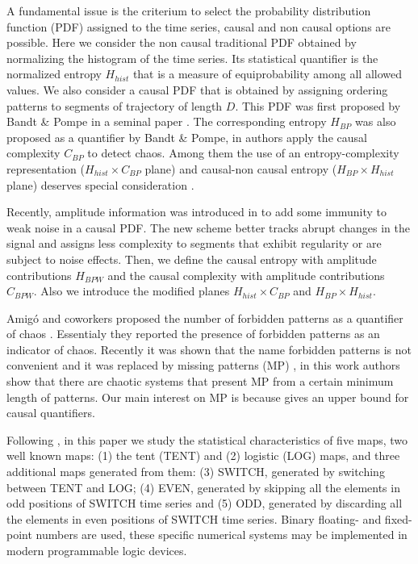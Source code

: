 A fundamental issue is the criterium to select the probability distribution function (PDF) assigned to the time series, causal and non causal options are possible.
Here we consider the non causal traditional PDF obtained by normalizing the histogram of the time series.
Its statistical quantifier is the normalized entropy $H_{hist}$ that is a measure of equiprobability among all allowed values.
We also consider a causal PDF that is obtained by assigning ordering patterns to segments of trajectory of length $D$.
This PDF was first proposed by Bandt \& Pompe in a seminal paper \cite{Bandt2002}.
The corresponding entropy $H_{BP}$ was also proposed as a quantifier by Bandt \& Pompe, in \cite{Rosso2007} authors apply the causal complexity $C_{BP}$ to detect chaos.
Among them the use of an entropy-complexity representation ($H_{hist} \times C_{BP}$ plane) and causal-non causal entropy ($H_{BP} \times H_{hist}$ plane) deserves special consideration \cite{DeMicco2009,Rosso2007,DeMicco2008,DeMicco2012,Rosso2010,Antonelli2017}.

Recently, amplitude information was introduced in \cite{Fadlallah2013} to add some immunity to weak noise in a causal PDF.
The new scheme better tracks abrupt changes in the signal and assigns less complexity to segments that exhibit regularity or are subject to noise effects.
Then, we define the causal entropy with amplitude contributions $H_{BPW}$ and the causal complexity with amplitude contributions $C_{BPW}$.
Also we introduce the modified planes $H_{hist} \times C_{BP}$ and $H_{BP} \times H_{hist}$.

Amig\'o and coworkers proposed the number of forbidden patterns as a quantifier of chaos \cite{Amigo2007a}.
Essentialy they reported the presence of forbidden patterns as an indicator of chaos.
Recently it was shown that the name forbidden patterns is not convenient and it was replaced by missing patterns (MP) \cite{Rosso2012}, in this work authors show that there are chaotic systems that present MP from a certain minimum length of patterns.
Our main interest on MP is because gives an upper bound for causal quantifiers.

Following \cite{Nagaraj2008}, in this paper we study the statistical characteristics of five maps, two well known maps: (1) the tent (TENT) and (2) logistic (LOG) maps, and three additional maps generated from them: (3) SWITCH, generated by switching between TENT and LOG; (4) EVEN, generated by skipping all the elements in odd positions of SWITCH time series and (5) ODD, generated by discarding all the elements in even positions of SWITCH time series.
Binary floating- and fixed-point numbers are used, these specific numerical systems may be implemented in modern programmable logic devices.

